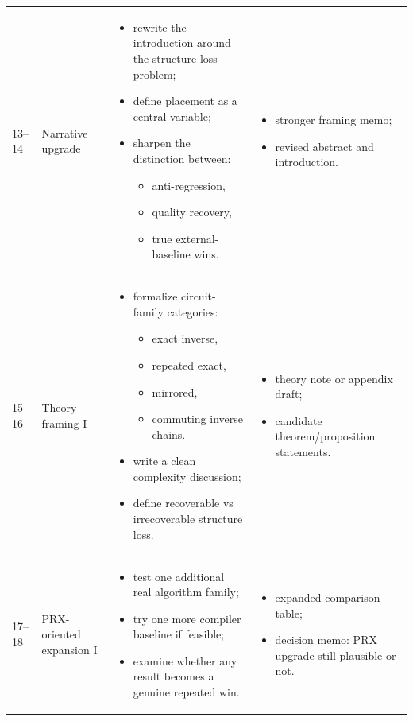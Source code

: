 \documentclass[11pt]{article}
\begin{document}
\begin{longtable}{p{} p{} p{} p{}}
13--14 &
Narrative upgrade &
\begin{itemize}
    \item rewrite the introduction around the structure-loss problem;
    \item define placement as a central variable;
    \item sharpen the distinction between:
    \begin{itemize}
        \item anti-regression,
        \item quality recovery,
        \item true external-baseline wins.
    \end{itemize}
\end{itemize}
&
\begin{itemize}
    \item stronger framing memo;
    \item revised abstract and introduction.
\end{itemize}
\\

15--16 &
Theory framing I &
\begin{itemize}
    \item formalize circuit-family categories:
    \begin{itemize}
        \item exact inverse,
        \item repeated exact,
        \item mirrored,
        \item commuting inverse chains.
    \end{itemize}
    \item write a clean complexity discussion;
    \item define recoverable vs irrecoverable structure loss.
\end{itemize}
&
\begin{itemize}
    \item theory note or appendix draft;
    \item candidate theorem/proposition statements.
\end{itemize}
\\

17--18 &
PRX-oriented expansion I &
\begin{itemize}
    \item test one additional real algorithm family;
    \item try one more compiler baseline if feasible;
    \item examine whether any result becomes a genuine repeated win.
\end{itemize}
&
\begin{itemize}
    \item expanded comparison table;
    \item decision memo: PRX upgrade still plausible or not.
\end{itemize}
\\


\end{longtable}
\end{document}
